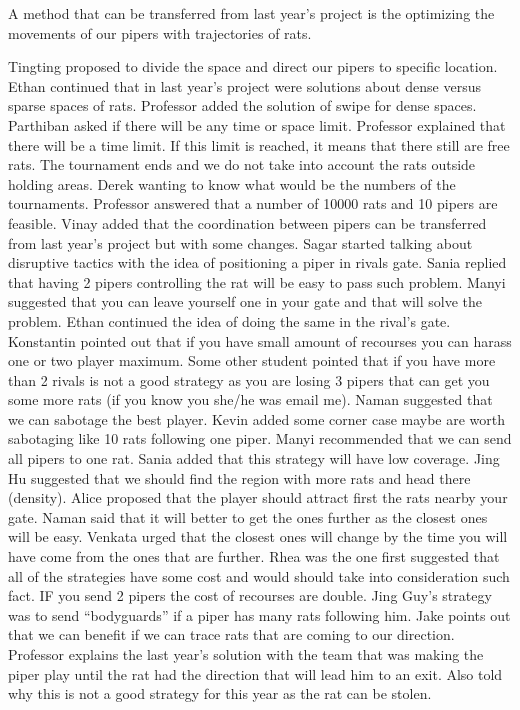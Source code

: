 A method that can be transferred from last year’s project is the optimizing the 
movements of our pipers with trajectories of rats. 

Tingting proposed to divide the space and direct our pipers to specific location.
Ethan continued that in last year’s project were solutions about dense versus sparse 
spaces of rats. Professor added the solution of swipe for dense spaces.
Parthiban asked if there will be any time or space limit. Professor explained that 
there will be a time limit. If this limit is reached, it means that there still 
are free rats. The tournament ends and we do not take into account the rats outside holding areas.
Derek wanting to know what would be the numbers of the tournaments. Professor answered that a number of 10000 rats and 10 pipers are feasible. 
Vinay added that the coordination between pipers can be transferred from last year’s project but with some changes.
Sagar started talking about disruptive tactics with the idea of positioning a piper 
in rivals gate. Sania replied that having 2 pipers controlling the rat will be 
easy to pass such problem. Manyi suggested that you can leave yourself one in your 
gate and that will solve the problem. Ethan continued the idea of doing the same 
in the rival’s gate. Konstantin pointed out that if you have small amount of 
recourses you can harass one or two player maximum. Some other student pointed 
that if you have more than 2 rivals is not a good strategy as you are losing 3 
pipers that can get you some more rats (if you know you she/he was email me).
Naman suggested that we can sabotage the best player. Kevin added some corner case maybe are worth sabotaging like 10 rats following one piper. 
Manyi recommended that we can send all pipers to one rat. Sania added that this strategy will have low coverage.
Jing Hu suggested that we should find the region with more rats and head there (density).
Alice proposed that the player should attract first the rats nearby your gate. Naman said that it will better to get the ones further as the closest ones will be easy. Venkata urged that the closest ones will change by the time you will have come from the ones that are further.
Rhea was the one first suggested that all of the strategies have some cost and would should take into consideration such fact. IF you send 2 pipers the cost of recourses are double.
Jing Guy’s strategy was to send “bodyguards” if a piper has many rats following him.
Jake points out that we can benefit if we can trace rats that are coming to our direction.
Professor explains the last year’s solution with the team that was making the piper play until the rat had the direction that will lead him to an exit. Also told why this is not a good strategy for this year as the rat can be stolen. 
